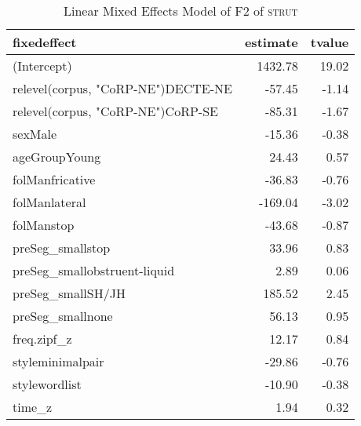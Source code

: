 \begin{table}[ht]
\centering
\begin{tabular}{lrr}
  \hline
fixedeffect & estimate & tvalue \\ 
  \hline
(Intercept) & 1432.78 & 19.02 \\ 
  relevel(corpus, "CoRP-NE")DECTE-NE & -57.45 & -1.14 \\ 
  relevel(corpus, "CoRP-NE")CoRP-SE & -85.31 & -1.67 \\ 
  sexMale & -15.36 & -0.38 \\ 
  ageGroupYoung & 24.43 & 0.57 \\ 
  folManfricative & -36.83 & -0.76 \\ 
  folManlateral & -169.04 & -3.02 \\ 
  folManstop & -43.68 & -0.87 \\ 
  preSeg\_smallstop & 33.96 & 0.83 \\ 
  preSeg\_smallobstruent-liquid & 2.89 & 0.06 \\ 
  preSeg\_smallSH/JH & 185.52 & 2.45 \\ 
  preSeg\_smallnone & 56.13 & 0.95 \\ 
  freq.zipf\_z & 12.17 & 0.84 \\ 
  styleminimalpair & -29.86 & -0.76 \\ 
  stylewordlist & -10.90 & -0.38 \\ 
  time\_z & 1.94 & 0.32 \\ 
   \hline
\end{tabular}
\caption{Linear Mixed Effects Model of F2 of \textsc{strut} \label{tbl:SF2}} 
\end{table}
